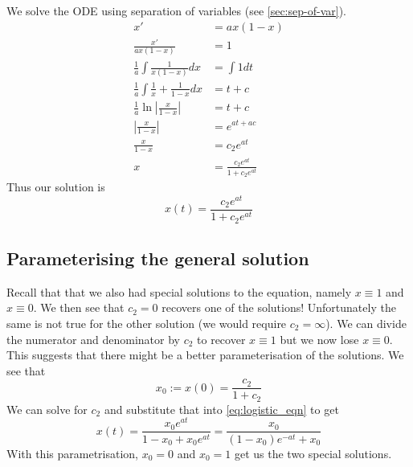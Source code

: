 We solve the ODE using separation of variables (see \autoref{sec:sep-of-var}).
\begin{align*}
    x' &= ax(1 - x)\\
    \frac{x'}{ax(1 - x)} &= 1\\
    \frac{1}{a} \int \frac{1}{x(1 - x)} dx &= \int 1 dt\\
    \frac{1}{a} \int \frac{1}{x} + \frac{1}{1 - x} dx &= t + c\\
    \frac{1}{a} \ln\left| \frac{x}{1- x} \right| &= t + c\\
    \left| \frac{x}{1- x} \right| &= e^{at + ac}\\
    \frac{x}{1 - x} &= c_2 e^{at}\\
    x &= \frac{c_2 e^{at}}{1 + c_2 e^{at}}
\end{align*}
Thus our solution is
\begin{equation}\label{eq:logistic_eqn}
    x(t) = \frac{c_2 e^{at}}{1 + c_2 e^{at}}
\end{equation}

\subsection{Parameterising the general solution}

Recall that that we also had special solutions to the equation, namely $x \equiv 1$ and $x \equiv 0$. We then see that $c_2 = 0$ recovers one of the solutions! Unfortunately the same is not true for the other solution (we would require $c_2 = \infty$). We can divide the numerator and denominator by $c_2$ to recover $x \equiv 1$ but we now lose $x \equiv 0$. This suggests that there might be a better parameterisation of the solutions. We see that 
$$ x_0 := x(0) = \frac{c_2}{1 + c_2} $$
We can solve for $c_2$ and substitute that into \eqref{eq:logistic_eqn} to get
\begin{equation}\label{eq:logistic_eqn2}
    x(t) = \frac{x_0 e^{at}}{1 - x_0 + x_0 e^{at}} = \frac{x_0}{(1 - x_0)e^{-at} + x_0}
\end{equation}
With this parametrisation, $x_0 = 0$ and $x_0 = 1$ get us the two special solutions.

